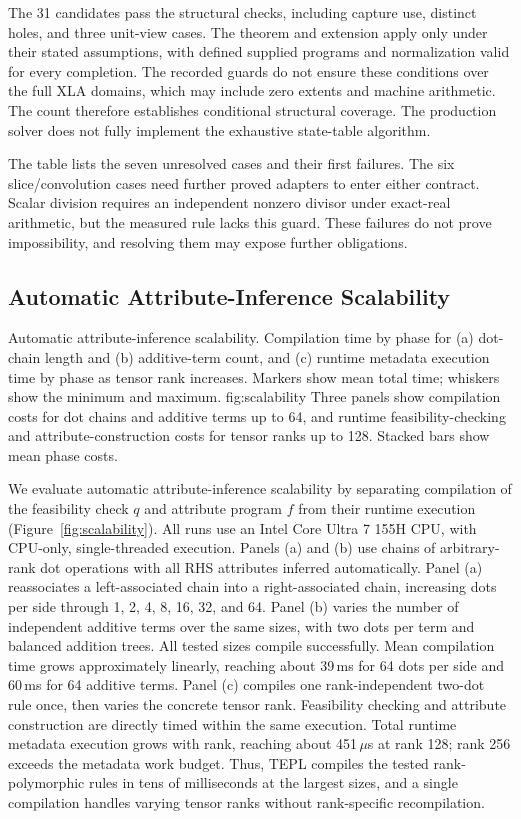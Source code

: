 The 31 candidates pass the structural checks, including capture use,
distinct holes, and three unit-view cases. The theorem and extension apply
only under their stated assumptions, with defined supplied programs and
normalization valid for every completion. The recorded guards do not ensure
these conditions over the full XLA domains, which may include zero extents
and machine arithmetic. The count therefore establishes conditional
structural coverage. The production solver does not fully implement the
exhaustive state-table algorithm.

The table lists the seven unresolved cases and their first failures.
The six slice/convolution cases need further proved adapters to enter either
contract. Scalar division requires an independent nonzero divisor under
exact-real arithmetic, but the measured rule lacks this guard. These failures
do not prove impossibility, and resolving them may expose further obligations.

\FloatBarrier
\subsection{Automatic Attribute-Inference Scalability}
\label{app:automatic-attribute-inference-scalability}
{Automatic attribute-inference scalability. Compilation time by phase for
(a) dot-chain length and (b) additive-term count, and (c) runtime metadata
execution time by phase as tensor rank increases. Markers show mean total
time; whiskers show the minimum and maximum.}
{fig:scalability}
{Three panels show compilation costs for dot chains and additive terms up
to 64, and runtime feasibility-checking and attribute-construction costs
for tensor ranks up to 128. Stacked bars show mean phase costs.}

We evaluate automatic attribute-inference scalability by separating
compilation of the feasibility check $q$ and attribute program $f$ from
their runtime execution (Figure~\ref{fig:scalability}). All runs use an
Intel Core Ultra 7 155H CPU, with CPU-only, single-threaded execution.
Panels (a) and (b) use chains of arbitrary-rank dot operations with all RHS
attributes inferred automatically. Panel (a) reassociates a left-associated
chain into a right-associated chain, increasing dots per side through
1, 2, 4, 8, 16, 32, and 64. Panel (b) varies the number of independent
additive terms over the same sizes, with two dots per term and balanced
addition trees. All tested sizes compile successfully. Mean compilation
time grows approximately linearly, reaching about 39\,ms for 64 dots per
side and 60\,ms for 64 additive terms. Panel (c) compiles one rank-independent
two-dot rule once, then varies the concrete tensor rank. Feasibility
checking and attribute construction are directly timed within the same
execution. Total runtime metadata execution grows with rank, reaching
about 451\,$\mu$s at rank 128; rank 256 exceeds the metadata work budget.
Thus, TEPL compiles the tested rank-polymorphic rules in tens of
milliseconds at the largest sizes, and a single compilation handles
varying tensor ranks without rank-specific recompilation.

